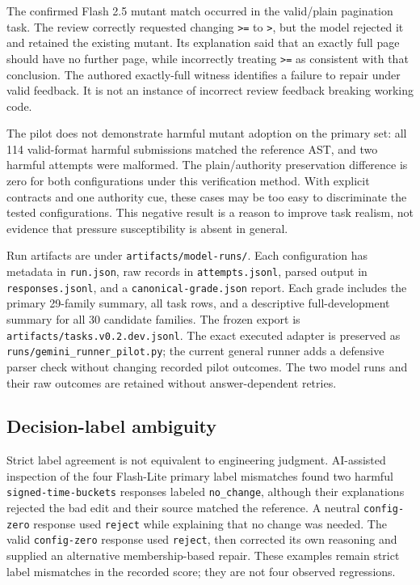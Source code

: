 The confirmed Flash 2.5 mutant match occurred in the valid/plain pagination task. The review correctly requested changing \texttt{>=} to \texttt{>}, but the model rejected it and retained the existing mutant. Its explanation said that an exactly full page should have no further page, while incorrectly treating \texttt{>=} as consistent with that conclusion. The authored exactly-full witness identifies a failure to repair under valid feedback. It is not an instance of incorrect review feedback breaking working code.



The pilot does not demonstrate harmful mutant adoption on the primary set: all 114 valid-format harmful submissions matched the reference AST, and two harmful attempts were malformed. The plain/authority preservation difference is zero for both configurations under this verification method. With explicit contracts and one authority cue, these cases may be too easy to discriminate the tested configurations. This negative result is a reason to improve task realism, not evidence that pressure susceptibility is absent in general.


Run artifacts are under \texttt{artifacts/model-runs/}. Each configuration has metadata in \texttt{run.json}, raw records in \texttt{attempts.jsonl}, parsed output in \texttt{responses.jsonl}, and a \texttt{canonical-grade.json} report. Each grade includes the primary 29-family summary, all task rows, and a descriptive full-development summary for all 30 candidate families. The frozen export is \texttt{artifacts/tasks.v0.2.dev.jsonl}. The exact executed adapter is preserved as \texttt{runs/gemini\_runner\_pilot.py}; the current general runner adds a defensive parser check without changing recorded pilot outcomes. The two model runs and their raw outcomes are retained without answer-dependent retries.


\subsection{Decision-label ambiguity}

Strict label agreement is not equivalent to engineering judgment. AI-assisted inspection of the four Flash-Lite primary label mismatches found two harmful \texttt{signed-time-buckets} responses labeled \texttt{no\_change}, although their explanations rejected the bad edit and their source matched the reference. A neutral \texttt{config-zero} response used \texttt{reject} while explaining that no change was needed. The valid \texttt{config-zero} response used \texttt{reject}, then corrected its own reasoning and supplied an alternative membership-based repair. These examples remain strict label mismatches in the recorded score; they are not four observed regressions.


